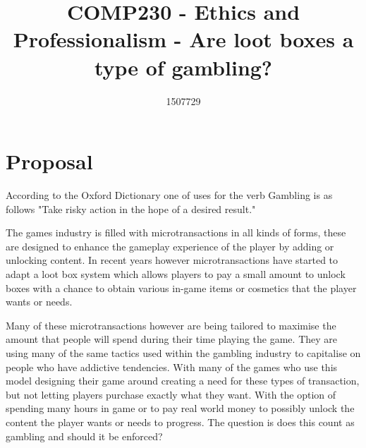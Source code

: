 \documentclass{scrartcl}
\title{COMP230 - Ethics and Professionalism - Are loot boxes a type of gambling?}
\author{1507729}
\begin{document}
\maketitle

\section{Proposal}
According to the Oxford Dictionary one of uses for the verb Gambling is as follows "Take risky action in the hope of a desired result."

The games industry is filled with microtransactions in all kinds of forms, these are designed to enhance the gameplay experience of the player by adding or unlocking content. In recent years however microtransactions have started to adapt a loot box system which allows players to pay a small amount to unlock boxes with a chance to obtain various in-game items or cosmetics that the player wants or needs.

Many of these microtransactions however are being tailored to maximise the amount that people will spend during their time playing the game. They are using many of the same tactics used within the gambling industry to capitalise on people who have addictive tendencies. With many of the games who use this model designing their game around creating a need for these types of transaction, but not letting players purchase exactly what they want. With the option of spending many hours in game or to pay real world money to possibly unlock the content the player wants or needs to progress. The question is does this count as gambling and should it be enforced?




\end{document}
